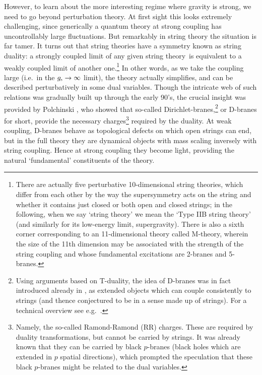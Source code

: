 \documentclass[12pt]{article}
\def\STY{string theory}
\def\gst{g_{\scriptscriptstyle {\rm s}}}
\begin{document}
However, to learn about the more interesting regime where gravity is strong, we need to go beyond perturbation theory.  At first sight this looks extremely challenging, since generically a quantum theory at strong coupling has uncontrollably large fluctuations.  But remarkably  in string theory the situation is far tamer.  It turns out that string theories have a symmetry known as string duality: a strongly coupled limit of any given \STY\ is equivalent to a weakly coupled limit of another one.\footnote{
There are actually five perturbative 10-dimensional string theories, which differ from each other by the way the supersymmetry acts on the string and whether it contains just closed or both open and closed strings; in the following, when we say `string theory' we mean the `Type IIB string theory' (and similarly for its low-energy limit, supergravity).  There is also a sixth corner corresponding to an 11-dimensional theory called M-theory, wherein the size of the 11th dimension may be associated with the strength of the string coupling and whose fundamental excitations are 2-branes and 5-branes.}  
In other words, as we take the coupling large (i.e.\ in the $\gst \to \infty$ limit), the theory actually simplifies, and can be described perturbatively in some dual variables.
Though the intricate web of such relations was gradually built up through the early 90's, the crucial insight was provided by Polchinski  \cite{Polchinski:1995mt}, who showed that so-called Dirichlet-branes,\footnote{
Using arguments based on T-duality, the idea of D-branes was in fact introduced already in \cite{Dai:1989ua}, 
as extended objects which can couple consistently to strings (and thence conjectured to be in a sense made up of strings).  For a technical overview see e.g.\ \cite{Polchinski:1996na}.
}  
or D-branes for short, provide the  necessary charges\footnote{
Namely, the so-called Ramond-Ramond (RR) charges.  These are required by duality transformations, but cannot be carried by strings.  It was already known that they can be carried by black $p$-branes \cite{Horowitz:1991cd} (black holes  which are extended in $p$ spatial directions), which prompted the speculation that these black $p$-branes might be related to the dual variables. 
}
 required by the duality.
At weak coupling, D-branes behave as topological defects on which open strings can end, but in the full theory they are dynamical objects with mass scaling inversely with string coupling.  Hence at strong coupling they become light, providing the natural `fundamental' constituents of the theory.
\end{document}
